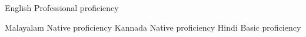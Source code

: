 
\begin{cvskills}

  \cvskill
    {English} %
    {Professional proficiency} %

  \cvskill
    {Malayalam} %
    {Native proficiency} %
  \cvskill
    {Kannada} %
    {Native proficiency} %
  \cvskill
    {Hindi} %
    {Basic proficiency} %

\end{cvskills}
